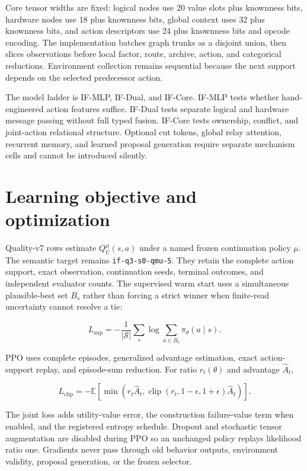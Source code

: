 \documentclass[
  american,
  10pt,
  a4paper,
]{article}
\begin{document}
Core tensor widths are fixed: logical nodes use 20 value slots plus
knownness bits, hardware nodes use 18 plus knownness bits, global
context uses 32 plus knownness bits, and action descriptors use 24 plus
knownness bits and opcode encoding. The implementation batches graph
trunks as a disjoint union, then slices observations before local
factor, route, archive, action, and categorical reductions. Environment
collection remains sequential because the next support depends on the
selected predecessor action.

The model ladder is IF-MLP, IF-Dual, and IF-Core. IF-MLP tests whether
hand-engineered action features suffice. IF-Dual tests separate logical
and hardware message passing without full typed fusion. IF-Core tests
ownership, conflict, and joint-action relational structure. Optional cut
tokens, global relay attention, recurrent memory, and learned proposal
generation require separate mechanism cells and cannot be introduced
silently.

\section{Learning objective and
optimization}\label{learning-objective-and-optimization}

Quality-v7 rows estimate \(Q_U^\mu(s,a)\) under a named frozen
continuation policy \(\mu\). The semantic target remains
\texttt{if-q3-s0-qmu-5}. They retain the complete action support,
exact observation, continuation seeds, terminal outcomes, and
independent evaluator counts. The supervised warm start uses a
simultaneous plausible-best set \(B_s\) rather than forcing a strict
winner when finite-read uncertainty cannot resolve a tie:

\[
L_{\mathrm{sup}}
=-\frac{1}{|\mathcal S|}\sum_s
\log\sum_{a\in B_s}\pi_\theta(a\mid s).
\]

PPO uses complete episodes, generalized advantage estimation, exact
action-support replay, and episode-sum reduction. For ratio
\(r_t(\theta)\) and advantage \(\widehat A_t\),

\[
L_{\mathrm{clip}}
=-\mathbb E\!\left[
\min\left(r_t\widehat A_t,
\operatorname{clip}(r_t,1-\epsilon,1+\epsilon)\widehat A_t\right)
\right].
\]

The joint loss adds utility-value error, the construction failure-value
term when enabled, and the registered entropy schedule. Dropout and
stochastic tensor augmentation are disabled during PPO so an unchanged
policy replays likelihood ratio one. Gradients never pass through old
behavior outputs, environment validity, proposal generation, or the
frozen selector.
\end{document}
